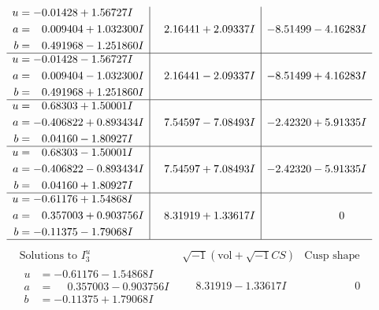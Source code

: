 \documentclass[1p]{elsarticle_modified}
\theoremstyle{definition}
\newcommand{\I}{\sqrt{-1}}
\begin{document}
$$\begin{array}{c|c|c}
\begin{aligned}
u &= -0.01428 + 1.56727 I \\
a &= \phantom{-}0.009404 + 1.032300 I \\
b &= \phantom{-}0.491968 - 1.251860 I\end{aligned}
 & \phantom{-}2.16441 + 2.09337 I & -8.51499 - 4.16283 I \\ \hline\begin{aligned}
u &= -0.01428 - 1.56727 I \\
a &= \phantom{-}0.009404 - 1.032300 I \\
b &= \phantom{-}0.491968 + 1.251860 I\end{aligned}
 & \phantom{-}2.16441 - 2.09337 I & -8.51499 + 4.16283 I \\ \hline\begin{aligned}
u &= \phantom{-}0.68303 + 1.50001 I \\
a &= -0.406822 + 0.893434 I \\
b &= \phantom{-}0.04160 - 1.80927 I\end{aligned}
 & \phantom{-}7.54597 - 7.08493 I & -2.42320 + 5.91335 I \\ \hline\begin{aligned}
u &= \phantom{-}0.68303 - 1.50001 I \\
a &= -0.406822 - 0.893434 I \\
b &= \phantom{-}0.04160 + 1.80927 I\end{aligned}
 & \phantom{-}7.54597 + 7.08493 I & -2.42320 - 5.91335 I \\ \hline\begin{aligned}
u &= -0.61176 + 1.54868 I \\
a &= \phantom{-}0.357003 + 0.903756 I \\
b &= -0.11375 - 1.79068 I\end{aligned}
 & \phantom{-}8.31919 + 1.33617 I & \phantom{-0.000000 } 0\\
 \hline 
 \end{array}$$\newpage$$\begin{array}{c|c|c}  
\text{Solutions to }I^u_{3}& \I (\text{vol} + \sqrt{-1}CS) & \text{Cusp shape}\\
 \hline 
\begin{aligned}
u &= -0.61176 - 1.54868 I \\
a &= \phantom{-}0.357003 - 0.903756 I \\
b &= -0.11375 + 1.79068 I\end{aligned}
 & \phantom{-}8.31919 - 1.33617 I & \phantom{-0.000000 } 0 \\ \hline\begin{aligned}

\end{aligned}
\end{array}$$
\end{document}
